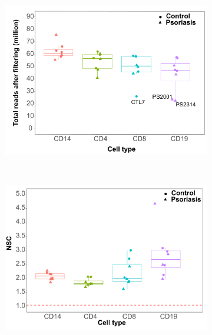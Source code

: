 \begin{figure}[htbp]
\centering
\begin{subfigure}{0.5\textwidth}
\centering
\includegraphics[width=\textwidth]{./Results2/pdfs/ChIPm_PS_CTL_final_filtered_reads_boxplot}
\caption{\textbf{}}
\end{subfigure} \\
\begin{subfigure}{0.5\textwidth}
\centering
\includegraphics[width=\textwidth]{./Results2/pdfs/ChIPm_PS_CTL_NSC_boxplot}
\caption{\textbf{}}
\end{subfigure}
\begin{subfigure}{0.5\textwidth}
\centering

\end{subfigure}
\end{figure}

